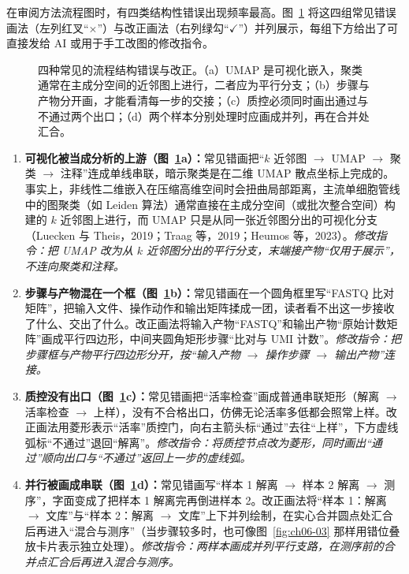 在审阅方法流程图时，有四类结构性错误出现频率最高。图~\ref{fig:ch06-04} 将这四组常见错误画法（左列红叉“$\times$”）与改正画法（右列绿勾“$\checkmark$”）并列展示，每组下方给出了可直接发给 AI 或用于手工改图的修改指令。

\begin{figure}[htbp]\centering

\caption{四种常见的流程结构错误与改正。（a）UMAP 是可视化嵌入，聚类通常在主成分空间的近邻图上进行，二者应为平行分支；（b）步骤与产物分开画，才能看清每一步的交接；（c）质控必须同时画出通过与不通过两个出口；（d）两个样本分别处理时应画成并列，再在合并处汇合。}\label{fig:ch06-04}
\end{figure}

\begin{enumerate}
\item \textbf{可视化被当成分析的上游（图~\ref{fig:ch06-04}a）：}常见错画把“$k$ 近邻图 $\rightarrow$ UMAP $\rightarrow$ 聚类 $\rightarrow$ 注释”连成单线串联，暗示聚类是在二维 UMAP 散点坐标上完成的。事实上，非线性二维嵌入在压缩高维空间时会扭曲局部距离，主流单细胞管线中的图聚类（如 Leiden 算法）通常直接在主成分空间（或批次整合空间）构建的 $k$ 近邻图上进行，而 UMAP 只是从同一张近邻图分出的可视化分支（Luecken 与 Theis，2019；Traag 等，2019；Heumos 等，2023）。\emph{修改指令：把 UMAP 改为从 $k$ 近邻图分出的平行分支，末端接产物“仅用于展示”，不连向聚类和注释。}
\item \textbf{步骤与产物混在一个框（图~\ref{fig:ch06-04}b）：}常见错画在一个圆角框里写“FASTQ 比对矩阵”，把输入文件、操作动作和输出矩阵揉成一团，读者看不出这一步接收了什么、交出了什么。改正画法将输入产物“FASTQ”和输出产物“原始计数矩阵”画成平行四边形，中间夹圆角矩形步骤“比对与 UMI 计数”。\emph{修改指令：把步骤框与产物平行四边形分开，按“输入产物 $\rightarrow$ 操作步骤 $\rightarrow$ 输出产物”连接。}
\item \textbf{质控没有出口（图~\ref{fig:ch06-04}c）：}常见错画把“活率检查”画成普通串联矩形（解离 $\rightarrow$ 活率检查 $\rightarrow$ 上样），没有不合格出口，仿佛无论活率多低都会照常上样。改正画法用菱形表示“活率”质控门，向右主箭头标“通过”去往“上样”，下方虚线弧标“不通过”退回“解离”。\emph{修改指令：将质控节点改为菱形，同时画出“通过”顺向出口与“不通过”返回上一步的虚线弧。}
\item \textbf{并行被画成串联（图~\ref{fig:ch06-04}d）：}常见错画写“样本 1 解离 $\rightarrow$ 样本 2 解离 $\rightarrow$ 测序”，字面变成了把样本 1 解离完再倒进样本 2。改正画法将“样本 1：解离 $\rightarrow$ 文库”与“样本 2：解离 $\rightarrow$ 文库”上下并列绘制，在实心合并圆点处汇合后再进入“混合与测序”（当步骤较多时，也可像图~\ref{fig:ch06-03} 那样用错位叠放卡片表示独立处理）。\emph{修改指令：两样本画成并列平行支路，在测序前的合并点汇合后再进入混合与测序。}
\end{enumerate}

